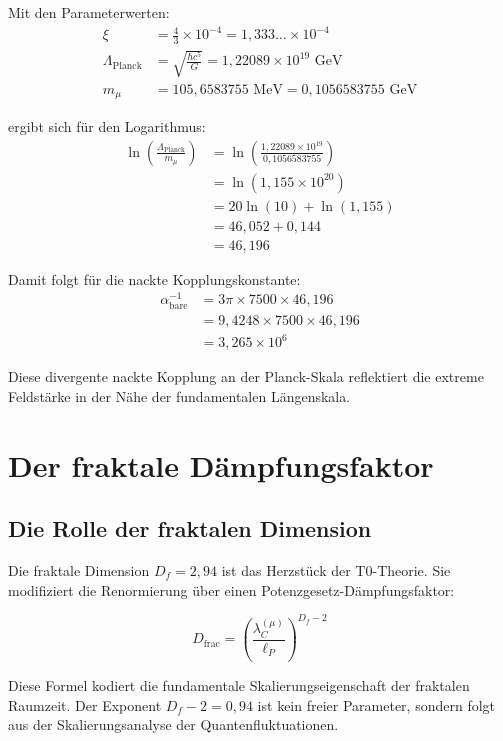 \documentclass[12pt,a4paper]{article}
\theoremstyle{definition}
\begin{document}
	Mit den Parameterwerten:
	\begin{align}
		\xi &= \frac{4}{3} \times 10^{-4} = 1{,}333\ldots \times 10^{-4}\\
		\Lambda_{\text{Planck}} &= \sqrt{\frac{\hbar c^5}{G}} = 1{,}22089 \times 10^{19} \text{ GeV}\\
		m_{\mu} &= 105{,}6583755 \text{ MeV} = 0{,}1056583755 \text{ GeV}
	\end{align}
	
	ergibt sich für den Logarithmus:
	\begin{align}
		\ln\left(\frac{\Lambda_{\text{Planck}}}{m_{\mu}}\right) &= \ln\left(\frac{1{,}22089 \times 10^{19}}{0{,}1056583755}\right)\\
		&= \ln(1{,}155 \times 10^{20})\\
		&= 20 \ln(10) + \ln(1{,}155)\\
		&= 46{,}052 + 0{,}144\\
		&= 46{,}196
	\end{align}
	
	Damit folgt für die nackte Kopplungskonstante:
	\begin{align}
		\alpha_{\text{bare}}^{-1} &= 3\pi \times 7500 \times 46{,}196\\
		&= 9{,}4248 \times 7500 \times 46{,}196\\
		&= 3{,}265 \times 10^6
	\end{align}
	
	Diese divergente nackte Kopplung an der Planck-Skala reflektiert die extreme Feldstärke in der Nähe der fundamentalen Längenskala.
	
	\section{Der fraktale Dämpfungsfaktor}
	
	\subsection{Die Rolle der fraktalen Dimension}
	
	Die fraktale Dimension $D_f = 2{,}94$ ist das Herzstück der T0-Theorie. Sie modifiziert die Renormierung über einen Potenzgesetz-Dämpfungsfaktor:
	
	\begin{equation}
		D_{\text{frac}} = \left(\frac{\lambda_C^{(\mu)}}{\ell_P}\right)^{D_f - 2}
	\end{equation}
	
	Diese Formel kodiert die fundamentale Skalierungseigenschaft der fraktalen Raumzeit. Der Exponent $D_f - 2 = 0{,}94$ ist kein freier Parameter, sondern folgt aus der Skalierungsanalyse der Quantenfluktuationen.
	
\end{document}
